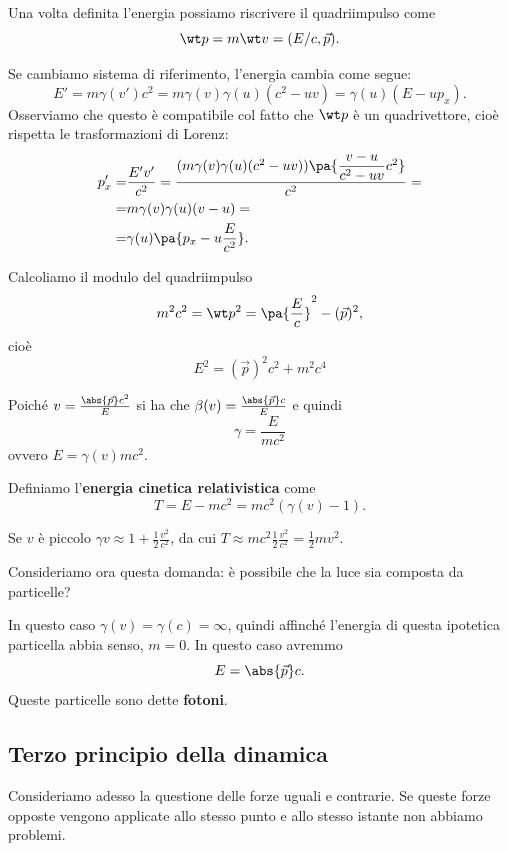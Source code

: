 \begin{remark}
Una volta definita l'energia possiamo riscrivere il quadriimpulso come
\[\wt p=m\wt v=(E/c,\vec p).\]
\end{remark}


\begin{remark}
Se cambiamo sistema di riferimento, l'energia cambia come segue:
\[E'=m\gamma(v')c^2=m\gamma(v)\gamma(u)(c^2-uv)=\gamma(u)(E-up_x).\]
Osserviamo che questo \`e compatibile col fatto che $\wt p$ \`e un quadrivettore, cio\`e rispetta le trasformazioni di Lorenz:
\begin{align*}
p'_x=&\frac{E' v'}{c^2}=\frac{(m\gamma(v)\gamma(u)(c^2-uv))\pa{\dfrac{v-u}{c^2-uv}c^2}}{c^2}=\\
=&m\gamma(v)\gamma(u)(v-u)=\\
=&\gamma(u)\pa{p_x-u\frac{E}{c^2}}.
\end{align*}
\end{remark}

\begin{remark}
Calcoliamo il modulo del quadriimpulso
\[m^2c^2=\wt p^2=\pa{\frac Ec}^2-(\vec p)^2,\]
cio\`e
\[\boxed{E^2=(\vec p)^2c^2+m^2c^4}\]
\end{remark}

\begin{remark}
Poich\'e $v=\frac{\abs{\vec p}c^2}E$ si ha che $\beta(v)=\frac{\abs{\vec p}c}E$ e quindi
\[\boxed{\gamma=\frac{E}{mc^2}}\]
ovvero $E=\gamma(v)mc^2$.
\end{remark}

\begin{definition}
Definiamo l'\textbf{energia cinetica relativistica} come
\[T=E-mc^2=mc^2(\gamma(v)-1).\]
\end{definition}
\begin{remark}
Se $v$ \`e piccolo $\gamma{v}\approx 1+\frac12\frac{v^2}{c^2}$, da cui $T\approx mc^2\frac 12\frac{v^2}{c^2}=\frac12 mv^2$.
\end{remark}

\noindent Consideriamo ora questa domanda: \`e possibile che la luce sia composta da particelle?\medskip

\noindent In questo caso $\gamma(v)=\gamma(c)=\infty$, quindi affinch\'e l'energia di questa ipotetica particella abbia senso, $m=0$. In questo caso avremmo
\[E=\abs{\vec p}c.\]
Queste particelle sono dette \textbf{fotoni}.

\subsection{Terzo principio della dinamica}
Consideriamo adesso la questione delle forze uguali e contrarie. Se queste forze opposte vengono applicate allo stesso punto e allo stesso istante non abbiamo problemi.\medskip

